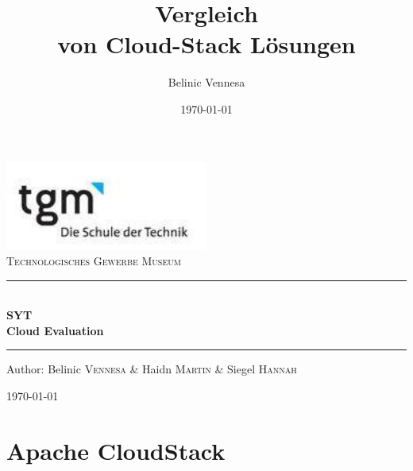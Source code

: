 \documentclass[a4paper,nochapterprefix,english,12pt]{scrreprt}
\title{Vergleich\\von Cloud-Stack Lösungen}
\author{Belinic Vennesa}
\date{\today}
\begin{document}
\begin{titlepage}
\begin{center}
\includegraphics[width=0.5\textwidth]{logo}\\[1cm]    

\textsc{\LARGE Technologisches Gewerbe Museum}\\[1.5cm]

\rule{1.0\textwidth}{1mm}
{ \huge \bfseries  \\\large SYT\\ \huge Cloud Evaluation \\[0.4cm] }

\rule{1.0\textwidth}{1mm}

\noindent 
\vspace{7cm}

\begin{center}
\large
Author: 
Belinic \textsc{Vennesa} \&
Haidn \textsc{Martin} \&
Siegel \textsc{Hannah}
\end{center}

\vfill

{\large \today}

\end{center}
\end{titlepage}

\newpage
\tableofcontents

\newpage
{}

\chapter{Apache CloudStack} \thispagestyle{fancy}
\end{document}
